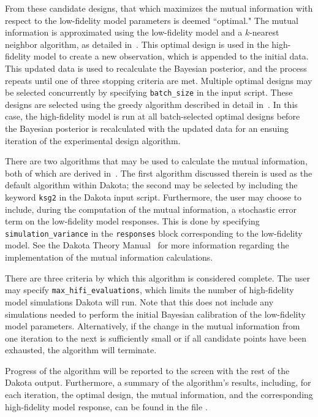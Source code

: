 From these candidate designs, that which maximizes the mutual information with
respect to the low-fidelity model parameters is deemed ``optimal." The mutual
information is approximated using the low-fidelity model and a $k$-nearest
neighbor algorithm, as detailed in~\cite{Lew16}. This optimal design is used in 
the high-fidelity model to create a new observation, which is appended to the 
initial data. This updated data is used to recalculate the Bayesian posterior,
and the process repeats until one of three stopping criteria are met.
Multiple optimal designs may be selected concurrently by specifying 
\texttt{batch\_size} in the input script. These designs are selected using
the greedy algorithm described in detail in~\cite{TheoMan}. In this case, the
high-fidelity model is run at all batch-selected optimal designs before the
Bayesian posterior is recalculated with the updated data for an ensuing 
iteration of the experimental design algorithm. 

There are two algorithms that may be used to calculate the mutual information,
both of which are derived in~\cite{Kra04}. The first algorithm discussed 
therein is used as the default algorithm within Dakota; the second may be 
selected by including the keyword \texttt{ksg2} in the Dakota input script. 
Furthermore, the user may choose to include, during the computation of the 
mutual information, a stochastic error term on the low-fidelity model 
responses. This is done by specifying \texttt{simulation\_variance} in the 
\texttt{responses} block corresponding to the low-fidelity model. See the 
Dakota Theory Manual~\cite{TheoMan} for more information regarding the 
implementation of the mutual information calculations.

There are three criteria by which this algorithm is considered complete. 
The user may specify \texttt{max\_hifi\_evaluations}, which limits the number 
of high-fidelity model simulations Dakota will run. Note that this does not 
include any simulations needed to perform the initial Bayesian calibration of 
the low-fidelity model parameters. Alternatively, if the change in the mutual 
information from one iteration to the next is sufficiently small or if all 
candidate points have been exhausted, the algorithm will terminate. 

Progress of the algorithm will be reported to the screen with the rest of the
Dakota output. Furthermore, a summary of the algorithm's results, including, 
for each iteration, the optimal design, the mutual information, and the 
corresponding high-fidelity model response, can be found in the file 
.

